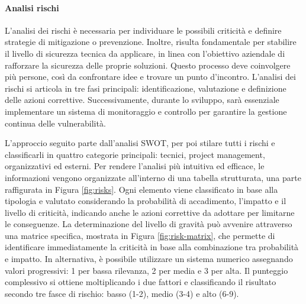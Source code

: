             \paragraph{Analisi rischi}\label{para:risks}
            L’analisi dei rischi è necessaria per individuare le possibili criticità e definire strategie di mitigazione o prevenzione.
            Inoltre, risulta fondamentale per stabilire il livello di sicurezza tecnica da applicare, in linea con l’obiettivo
            aziendale di rafforzare la sicurezza delle proprie soluzioni. Questo processo deve coinvolgere più persone, così da
            confrontare idee e trovare un punto d’incontro.
            L’analisi dei rischi si articola in tre fasi principali: identificazione, valutazione e definizione delle azioni correttive.
            Successivamente, durante lo sviluppo, sarà essenziale implementare un sistema di monitoraggio e controllo per garantire
            la gestione continua delle vulnerabilità.

            L’approccio seguito parte dall'analisi SWOT, per poi stilare tutti i rischi e classificarli
            in quattro categorie principali: tecnici, project management, organizzativi ed esterni.
            Per rendere l’analisi più intuitiva ed efficace, le informazioni vengono organizzate all’interno di una tabella strutturata,
            una parte raffigurata in Figura \ref{fig:risks}.
            Ogni elemento viene classificato in base alla tipologia e valutato considerando la probabilità di accadimento, l’impatto
            e il livello di criticità, indicando anche le azioni correttive da adottare per limitarne le conseguenze.
            La determinazione del livello di gravità può avvenire attraverso una matrice specifica, mostrata in Figura \ref{fig:risk-matrix},
            che permette di identificare
            immediatamente la criticità in base alla combinazione tra probabilità e impatto. In alternativa, è possibile utilizzare
            un sistema numerico assegnando valori progressivi: 1 per bassa rilevanza, 2 per media e 3 per alta. Il punteggio
            complessivo si ottiene moltiplicando i due fattori e classificando il risultato secondo tre fasce di rischio:
            basso (1-2), medio (3-4) e alto (6-9).

